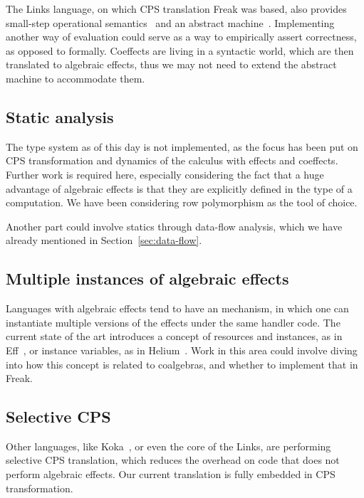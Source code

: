 \documentclass[declaration,shortabstract]{iithesis}
\theoremstyle{definition} \newtheorem{definition}{Definition}[chapter]
\theoremstyle{remark} \newtheorem{remark}[definition]{Observation}
\theoremstyle{plain} \newtheorem{theorem}[definition]{Theorem}
\theoremstyle{plain} \newtheorem{lemma}[definition]{Lemma}
\begin{document}
    The Links language, on which CPS translation Freak was based, also provides
    small-step operational semantics~\cite{handlers-cps} and an abstract
    machine~\cite{liberating-effects}. Implementing another way of evaluation
    could serve as a way to empirically assert correctness, as opposed to formally.
    Coeffects are living in a syntactic world, which are then translated to
    algebraic effects, thus we may not need to extend the abstract machine to
    accommodate them.

    \subsection{Static analysis}

    The type system as of this day is not implemented, as the focus has been put
    on CPS transformation and dynamics of the calculus with effects and coeffects.
    Further work is required here, especially considering the fact that a huge
    advantage of algebraic effects is that they are explicitly defined in the
    type of a computation. We have been considering row polymorphism as the
    tool of choice.

    Another part could involve statics through data-flow analysis, which we
    have already mentioned in Section~\ref{sec:data-flow}.

    \subsection{Multiple instances of algebraic effects}

    Languages with algebraic effects tend to have an mechanism, in which one
    can instantiate multiple versions of the effects under the same handler
    code. The current state of the art introduces a concept of resources and
    instances, as in Eff~\cite{programming-in-eff}, or instance variables, as
    in Helium~\cite{binders-labels}. Work in this area could involve diving
    into how this concept is related to coalgebras, and whether to implement
    that in Freak.

    \subsection{Selective CPS}

    Other languages, like Koka~\cite{leijen-koka}, or even the core of the Links,
    are performing selective CPS translation, which reduces the overhead on code
    that does not perform algebraic effects. Our current translation is fully
    embedded in CPS transformation.
\end{document}
